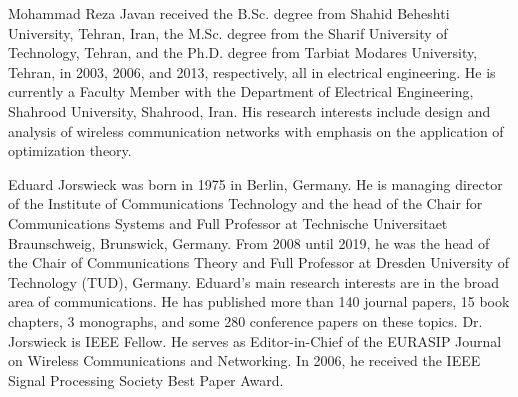 \documentclass[journal]{IEEEtran}
\begin{document}
\begin{IEEEbiography} {Mohammad Reza Javan}
received the B.Sc. degree from Shahid Beheshti University, Tehran, Iran, the M.Sc. degree from the Sharif University of Technology, Tehran, and the Ph.D. degree from Tarbiat Modares University, Tehran, in 2003, 2006, and 2013, respectively, all in electrical engineering. He is currently a Faculty Member with the Department of Electrical Engineering, Shahrood University, Shahrood, Iran. His research interests include design and analysis of wireless communication networks with emphasis on the application of optimization theory.
\end{IEEEbiography}
\begin{IEEEbiography} {Eduard Jorswieck}
was born in 1975 in Berlin, Germany. He is managing director of the Institute of Communications Technology and the head of the Chair for Communications Systems and Full Professor at Technische Universitaet Braunschweig, Brunswick, Germany. From 2008 until 2019, he was the head of the Chair of Communications Theory and Full Professor at Dresden University of Technology (TUD), Germany. Eduard's main research interests are in the broad area of communications. He has published more than 140 journal papers, 15 book chapters, 3 monographs, and some 280 conference papers on these topics. Dr. Jorswieck is IEEE Fellow. He serves as Editor-in-Chief of the EURASIP Journal on Wireless Communications and Networking. In 2006, he received the IEEE Signal Processing Society Best Paper Award.	
\end{IEEEbiography}
\end{document}
